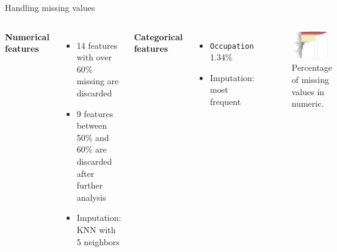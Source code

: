 \documentclass[aspectratio=169,xcolor=dvipsnames]{beamer}
\begin{document}
\begin{frame}{Handling missing values}

    \begin{columns}[t]
        \textbf{Numerical features}

        \begin{itemize}
            \item 14 features with over 60\% missing are discarded
            \item 9 features between 50\% and 60\% are discarded after further analysis
            \item Imputation: KNN with 5 neighbors 
        \end{itemize}

        \vspace{0.5cm}
        
        \textbf{Categorical features}
        
        \begin{itemize}
            \item \texttt{Occupation} 1.34\%
            \item Imputation: most frequent
        \end{itemize}

        \begin{figure}[htpb]
            \centering
            \includegraphics[width=0.9\textwidth]{missing_values_percentages.pdf}
            \captionsetup{font=tiny} %
            \caption{Percentage of missing values in numeric.}
        \end{figure}
        
    \end{columns}

\end{frame}
\end{document}
